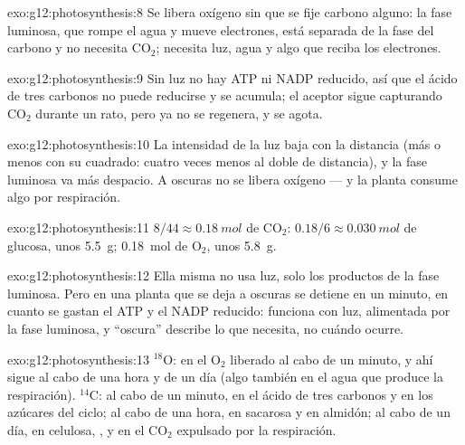 \begin{solution}{exo:g12:photosynthesis:8}
Se libera oxígeno sin que se fije carbono alguno: la fase luminosa, que
rompe el agua y mueve electrones, está separada de la fase del carbono
y no necesita $\mathrm{CO_2}$; necesita luz, agua y algo que reciba los
electrones.
\end{solution}

\begin{solution}{exo:g12:photosynthesis:9}
Sin luz no hay ATP ni NADP reducido, así que el ácido de tres carbonos
no puede reducirse y se acumula; el aceptor sigue capturando
$\mathrm{CO_2}$ durante un rato, pero ya no se regenera, y se agota.
\end{solution}

\begin{solution}{exo:g12:photosynthesis:10}
La intensidad de la luz baja con la distancia (más o menos con su
cuadrado: cuatro veces menos al doble de distancia), y la fase luminosa
va más despacio. A oscuras no se libera oxígeno --- y la planta consume
algo por respiración.
\end{solution}

\begin{solution}{exo:g12:photosynthesis:11}
$8/44 \approx \qty{0.18}{mol}$ de $\mathrm{CO_2}$: $0.18/6 \approx
\qty{0.030}{mol}$ de glucosa, unos \qty{5.5}{g}; \qty{0.18}{mol} de
$\mathrm{O_2}$, unos \qty{5.8}{g}.
\end{solution}

\begin{solution}{exo:g12:photosynthesis:12}
Ella misma no usa luz, solo los productos de la fase luminosa. Pero en
una planta que se deja a oscuras se detiene en un minuto, en cuanto se
gastan el ATP y el NADP reducido: funciona con luz, alimentada por la
fase luminosa, y ``oscura'' describe lo que necesita, no cuándo ocurre.
\end{solution}

\begin{solution}{exo:g12:photosynthesis:13}
$^{18}$O: en el $\mathrm{O_2}$ liberado al cabo de un minuto, y ahí
sigue al cabo de una hora y de un día (algo también en el agua que
produce la respiración). $^{14}$C: al cabo de un minuto, en el ácido de
tres carbonos y en los azúcares del ciclo; al cabo de una hora, en
sacarosa y en almidón; al cabo de un día, en celulosa, ,
 y en el $\mathrm{CO_2}$ expulsado por la respiración.
\end{solution}

